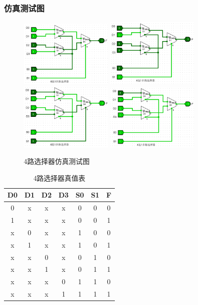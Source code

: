 \documentclass{article}
\begin{document}
    \subsubsection{仿真测试图}
    \begin{figure}[H]
    \centering
    \includegraphics[width=0.4\textwidth]{6.5.1.png}
    \includegraphics[width=0.4\textwidth]{6.5.2.png}
    \includegraphics[width=0.4\textwidth]{6.5.3.png}
    \includegraphics[width=0.4\textwidth]{6.5.4.png}
    \caption{4路选择器仿真测试图}
    \end{figure}

    \begin{table}[H]
    \centering
    \begin{tabular}{|c c c c|c c|c|}
        \hline
        D0 & D1 & D2 & D3 & S0 & S1 & F \\ \hline
        0 & x & x & x & 0 & 0 & 0 \\ \hline
        1 & x & x & x & 0 & 0 & 1 \\ \hline
        x & 0 & x & x & 1 & 0 & 0 \\ \hline
        x & 1 & x & x & 1 & 0 & 1 \\ \hline
        x & x & 0 & x & 0 & 1 & 0 \\ \hline
        x & x & 1 & x & 0 & 1 & 1 \\ \hline
        x & x & x & 0 & 1 & 1 & 0 \\ \hline
        x & x & x & 1 & 1 & 1 & 1 \\ \hline
    \end{tabular}
    \caption{4路选择器真值表}
    \end{table}
\end{document}
